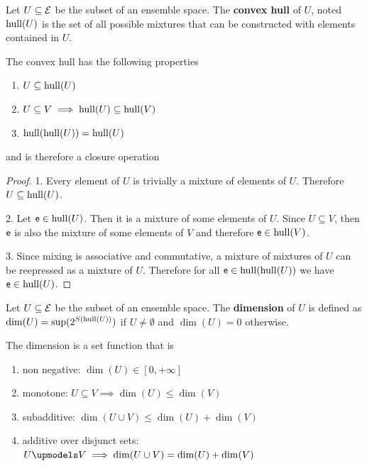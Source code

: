 \begin{defn}
	Let $U \subseteq \mathcal{E}$ be the subset of an ensemble space. The \textbf{convex hull} of $U$, noted $\mathrm{hull}(U)$ is the set of all possible mixtures that can be constructed with elements contained in $U$.
\end{defn}

\begin{coro}
	The convex hull has the following properties
	\begin{enumerate}
		\item $U \subseteq \mathrm{hull}(U)$
		\item $U \subseteq V \implies \mathrm{hull}(U) \subseteq \mathrm{hull}(V)$
		\item $\mathrm{hull}(\mathrm{hull}(U)) = \mathrm{hull}(U)$
	\end{enumerate}
	and is therefore a closure operation
\end{coro}

\begin{proof}
	1. Every element of $U$ is trivially a mixture of elements of $U$. Therefore $U \subseteq \mathrm{hull}(U)$.
	
	2. Let $\mathsf{e} \in \mathrm{hull}(U)$. Then it is a mixture of some elements of $U$. Since $U \subseteq V$, then $\mathsf{e}$ is also the mixture of some elements of $V$ and therefore $\mathsf{e} \in \mathrm{hull}(V)$.
	
	3. Since mixing is associative and commutative, a mixture of mixtures of $U$ can be reepressed as a mixture of $U$. Therefore for all $\mathsf{e} \in \mathrm{hull}(\mathrm{hull}(U))$ we have $\mathsf{e} \in \mathrm{hull}(U)$.
\end{proof}

\begin{defn}
	Let $U \subseteq \mathcal{E}$ be the subset of an ensemble space. The \textbf{dimension} of $U$ is defined as $\dim(U) = \sup(2^{S(\mathrm{hull}(U))})$ if $U \neq \emptyset$ and $\dim(U) = 0$ otherwise.
\end{defn}

\begin{prop}
	The dimension is a set function that is
	\begin{enumerate}
		\item non negative: $\dim(U) \in [0, +\infty]$
		\item monotone: $U \subseteq V \implies \dim(U) \leq \dim(V)$
		\item subadditive: $\dim(U \cup V) \leq \dim(U) + \dim(V)$
		\item additive over disjunct sets: $U \disjunct V \implies \dim(U \cup V) = \dim(U) + \dim(V)$ 
	\end{enumerate}
\end{prop}

